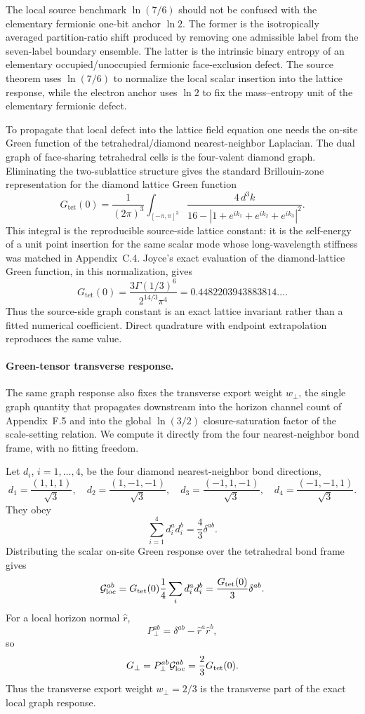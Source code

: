 \documentclass[11pt]{article}
\begin{document}
The local source benchmark $\ln(7/6)$ should not be confused with the elementary fermionic one-bit anchor $\ln2$. The former is the isotropically averaged partition-ratio shift produced by removing one admissible label from the seven-label boundary ensemble. The latter is the intrinsic binary entropy of an elementary occupied/unoccupied fermionic face-exclusion defect. The source theorem uses $\ln(7/6)$ to normalize the local scalar insertion into the lattice response, while the electron anchor uses $\ln2$ to fix the mass--entropy unit of the elementary fermionic defect.

To propagate that local defect into the lattice field equation one needs the on-site Green function of the tetrahedral/diamond nearest-neighbor Laplacian. The dual graph of face-sharing tetrahedral cells is the four-valent diamond graph. Eliminating the two-sublattice structure gives the standard Brillouin-zone representation for the diamond lattice Green function \citep{Guttmann2010}
\[
G_{\mathrm{tet}}(0)
=
\frac{1}{(2\pi)^3}
\int_{[-\pi,\pi]^3}
\frac{4\,d^3k}
{16-\left|1+e^{ik_1}+e^{ik_2}+e^{ik_3}\right|^2}.
\]
This integral is the reproducible source-side lattice constant: it is the self-energy of a unit point insertion for the same scalar mode whose long-wavelength stiffness was matched in Appendix~C.4. Joyce's exact evaluation of the diamond-lattice Green function, in this normalization, gives \citep{Joyce1994,Guttmann2010}
\[
G_{\mathrm{tet}}(0)
=
\frac{3\Gamma(1/3)^6}{2^{14/3}\pi^4}
=
0.4482203943883814\ldots .
\]
Thus the source-side graph constant is an exact lattice invariant rather than a fitted numerical coefficient. Direct quadrature with endpoint extrapolation reproduces the same value.

\paragraph{Green-tensor transverse response.}
The same graph response also fixes the transverse export weight $w_\perp$, the single graph quantity that propagates downstream into the horizon channel count of Appendix~F.5 and into the global $\ln(3/2)$ closure-saturation factor of the scale-setting relation. We compute it directly from the four nearest-neighbor bond frame, with no fitting freedom.

Let $d_i$, $i=1,\ldots,4$, be the four diamond nearest-neighbor bond directions,
\[
d_1=\frac{(1,1,1)}{\sqrt3},\quad
d_2=\frac{(1,-1,-1)}{\sqrt3},\quad
d_3=\frac{(-1,1,-1)}{\sqrt3},\quad
d_4=\frac{(-1,-1,1)}{\sqrt3}.
\]
They obey
\[
\sum_{i=1}^4 d_i^a d_i^b=\frac43\delta^{ab}.
\]
Distributing the scalar on-site Green response over the tetrahedral bond frame gives
\[
{\cal G}_{\rm loc}^{ab}
=
G_{\mathrm{tet}}(0)\frac14\sum_i d_i^a d_i^b
=
\frac{G_{\mathrm{tet}}(0)}{3}\delta^{ab}.
\]
For a local horizon normal $\hat r$,
\[
P_\perp^{ab}=\delta^{ab}-\hat r^a\hat r^b,
\]
so
\[
G_\perp=P_\perp^{ab}{\cal G}_{\rm loc}^{ab}
=
\frac23G_{\mathrm{tet}}(0).
\]
Thus the transverse export weight $w_\perp=2/3$ is the transverse part of the exact local graph response.
\end{document}
